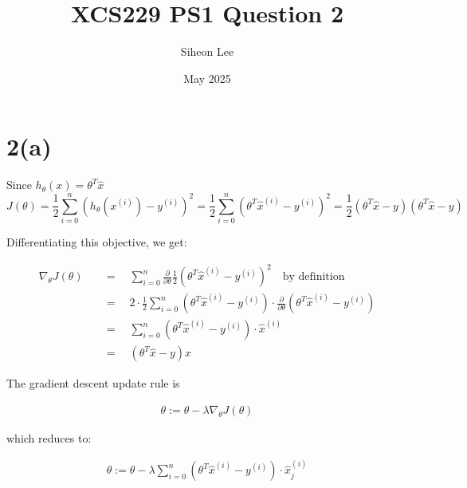 \documentclass{article}
\title{XCS229 PS1 Question 2}
\author{Siheon Lee}
\date{May 2025}
\begin{document}
\maketitle

\section{2(a)}

Since $h_\theta(x) = \theta^T\hat{x}$
\[J(\theta) = \frac{1}{2} \sum_{i=0}^n (h_\theta(x^{(i)}) - y^{(i)})^2 = \frac{1}{2} \sum_{i=0}^n (\theta^T\hat{x}^{(i)} - y^{(i)})^2 = \frac{1}{2} (\theta^T \hat{x} - y) (\theta^T \hat{x} - y) \]

Differentiating this objective, we get:

\begin{align*}
    \nabla_\theta J(\theta) \quad &= \quad \sum_{i=0}^n \frac{\partial}{\partial \theta} \frac{1}{2} (\theta^T\hat{x}^{(i)} - y^{(i)})^2 \quad \text{by definition} \\
    &= \quad 2 \cdot \frac{1}{2} \sum_{i=0}^n (\theta^T\hat{x}^{(i)} - y^{(i)})  \cdot \frac{\partial}{\partial \theta} (\theta^T\hat{x}^{(i)} - y^{(i)}) \\
    &= \quad \sum_{i=0}^n (\theta^T\hat{x}^{(i)} - y^{(i)})  \cdot \hat{x}^{(i)} \\
    &= \quad (\theta^T \hat{x} - y) \hat{x}
\end{align*}

The gradient descent update rule is

\begin{align*}
    \theta := \theta - \lambda \nabla_\theta J(\theta)
\end{align*}

which reduces to:

\begin{align*}
    \theta := \theta - \lambda \sum_{i=0}^n (\theta^T\hat{x}^{(i)} - y^{(i)})  \cdot \hat{x}_j^{(i)}
\end{align*}
\end{document}
